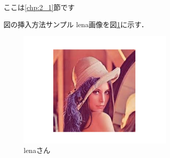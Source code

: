 ここは\ref{chp:2_1}節です

図の挿入方法サンプル
lena画像を図\ref{fig:sample}に示す．

\begin{figure}[]
\begin{center}
\includegraphics[width=7.5cm]{image/lena.pdf}
\caption{lenaさん}
\label{fig:sample}
\end{center}
\end{figure}
